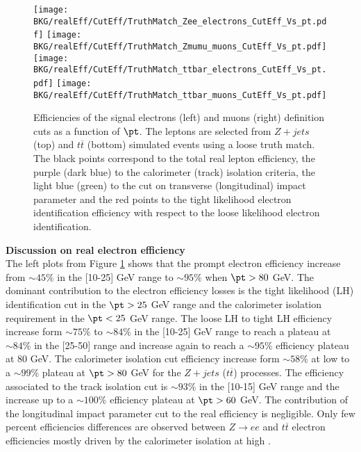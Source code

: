 	
\begin{figure}[!htb]
  \begin{center} 
	   \texttt{[image: BKG/realEff/CutEff/TruthMatch\_Zee\_electrons\_CutEff\_Vs\_pt.pdf]} 
	   \texttt{[image: BKG/realEff/CutEff/TruthMatch\_Zmumu\_muons\_CutEff\_Vs\_pt.pdf]} 
	   \texttt{[image: BKG/realEff/CutEff/TruthMatch\_ttbar\_electrons\_CutEff\_Vs\_pt.pdf]} 
	   \texttt{[image: BKG/realEff/CutEff/TruthMatch\_ttbar\_muons\_CutEff\_Vs\_pt.pdf]} 
	   \caption{\label{fig:CutEff_MC} Efficiencies of the signal electrons (left) and muons (right) definition cuts as a function of $\pt$. The leptons are selected from $Z+jets$ (top) and $t\overline{t}$ (bottom) simulated events using a loose truth match. The black points correspond to the total real lepton efficiency, the purple (dark blue) to the calorimeter (track) isolation criteria, the light blue (green) to the cut on transverse (longitudinal) impact parameter and the red points to the tight likelihood electron identification efficiency with respect to the loose likelihood electron identification.}
  \end{center}
\end{figure}				

	
	\par{\bf Discussion on real electron efficiency \\}
        The left plots from Figure \ref{fig:CutEff_MC} shows that the prompt electron efficiency increase from $\sim 45\%$ in the [10-25] GeV \pt range to $\sim 95\%$ when $\pt > 80$ GeV. The dominant contribution to the electron efficiency losses is the tight likelihood (LH) identification cut in the $\pt > 25$ GeV range and the calorimeter isolation requirement in the  $\pt < 25$ GeV range. The loose LH to tight LH efficiency increase form $\sim 75\%$ to $\sim 84\%$ in the [10-25] GeV \pt range to reach a plateau at $\sim 84\%$ in the [25-50] range and increase again to reach a $\sim 95\%$ efficiency plateau at 80 GeV. The calorimeter isolation cut efficiency increase form $\sim 58\%$ at low \pt to a $\sim 99\%$ plateau at $\pt > 80$ GeV for the $Z+jets$ ($t\overline{t}$) processes. The efficiency associated to the track isolation cut is $\sim 93\%$ in the [10-15] GeV \pt range and the increase up to a $\sim 100\%$ efficiency plateau at $\pt > 60$ GeV. The contribution of the longitudinal impact parameter cut to the real efficiency is negligible. Only few percent efficiencies differences are observed between $Z\rightarrow ee$ and $t\overline{t}$ electron efficiencies mostly driven by the calorimeter isolation at high \pt. 

